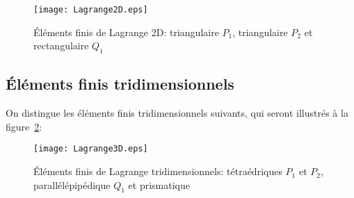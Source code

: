 \begin{figure}[ht]
\centering
\texttt{[image: Lagrange2D.eps]}
\caption{\label{Lagrange2D} Éléments finis de Lagrange 2D: triangulaire $P_1$, triangulaire $P_2$ et rectangulaire $Q_1$}
\end{figure}

\medskip
\subsection*{Éléments finis tridimensionnels}

On distingue les éléments finis tridimensionnels suivants, qui seront illustrés à la figure~\ref{Lagrange3D}:
\begin{figure}[ht]
\centering
\texttt{[image: Lagrange3D.eps]}
\caption{Éléments finis de Lagrange tridimensionnels: tétraédriques $P_1$ et $P_2$, parallélépipédique $Q_1$ et prismatique}\label{Lagrange3D}
\end{figure}
